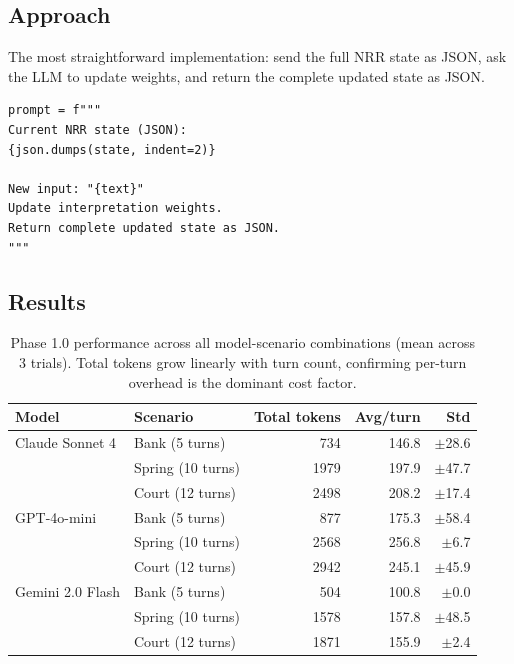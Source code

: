 \documentclass[11pt,a4paper]{article}
\begin{document}
\subsection{Approach}

The most straightforward implementation: send the full NRR state as JSON, ask the
LLM to update weights, and return the complete updated state as JSON.

\begin{lstlisting}
prompt = f"""
Current NRR state (JSON):
{json.dumps(state, indent=2)}

New input: "{text}"
Update interpretation weights.
Return complete updated state as JSON.
"""
\end{lstlisting}

\subsection{Results}

\begin{table}[ht]
\centering
\begin{tabular}{llrrr}
\toprule
\textbf{Model} & \textbf{Scenario} & \textbf{Total tokens} & \textbf{Avg/turn} & \textbf{Std} \\
\midrule
Claude Sonnet 4 & Bank (5 turns) & 734 & 146.8 & $\pm$28.6 \\
                & Spring (10 turns) & 1979 & 197.9 & $\pm$47.7 \\
                & Court (12 turns) & 2498 & 208.2 & $\pm$17.4 \\
\midrule
GPT-4o-mini     & Bank (5 turns) & 877 & 175.3 & $\pm$58.4 \\
                & Spring (10 turns) & 2568 & 256.8 & $\pm$6.7 \\
                & Court (12 turns) & 2942 & 245.1 & $\pm$45.9 \\
\midrule
Gemini 2.0 Flash & Bank (5 turns) & 504 & 100.8 & $\pm$0.0 \\
                  & Spring (10 turns) & 1578 & 157.8 & $\pm$48.5 \\
                  & Court (12 turns) & 1871 & 155.9 & $\pm$2.4 \\
\bottomrule
\end{tabular}
\caption{Phase 1.0 performance across all model-scenario combinations (mean across 3 trials).
Total tokens grow linearly with turn count, confirming per-turn overhead is the dominant cost factor.}
\label{tab:phase1_0}
\end{table}
\end{document}
